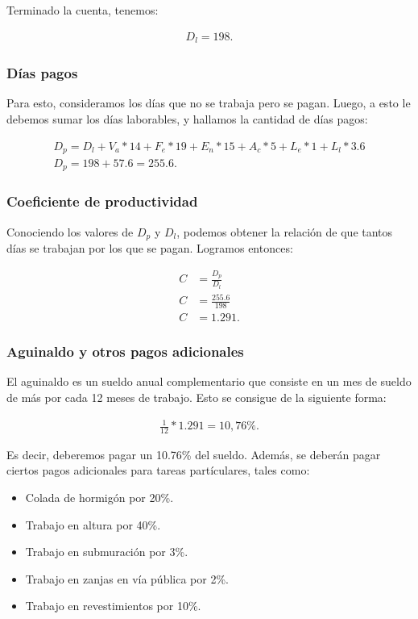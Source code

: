 \documentclass[../main.tex]{subfiles}
\begin{document}
Terminado la cuenta, tenemos:

\begin{align*}
  D_l = 198
.\end{align*}

\subsubsection{Días pagos}

Para esto, consideramos los días que no se trabaja pero se pagan. Luego, a esto
le debemos sumar los días laborables, y hallamos la cantidad de días pagos:

\begin{align*}
D_p = D_l + V_a * 14 + F_e * 19 + E_n * 15 + A_c * 5 + L_e * 1 + L_l * 3.6 \\[5pt]
D_p = 198 + 57.6 = 255.6
.\end{align*}

\subsubsection{Coeficiente de productividad}

Conociendo los valores de $D_p$ y $D_{l}$, podemos obtener la relación de que tantos
días se trabajan por los que se pagan. Logramos entonces:

\begin{align*}
 C &= \frac{D_p}{D_l} \\[5pt]
 C &= \frac{255.6}{198} \\[5pt]
 C &= 1.291
.\end{align*}

\subsubsection{Aguinaldo y otros pagos adicionales}

El aguinaldo es un sueldo anual complementario que consiste en un mes de sueldo 
de más por cada 12 meses de trabajo. Esto se consigue de la siguiente forma:

\begin{align*}
  \frac{1}{12} * 1.291 = 10,76 \%
.\end{align*}

Es decir, deberemos pagar un 10.76\% del sueldo. 
Además, se deberán pagar ciertos pagos adicionales para tareas partículares, tales
como:

\begin{itemize}
  \item Colada de hormigón por 20\%.
  \item Trabajo en altura por 40\%.
  \item Trabajo en submuración por 3\%.
  \item Trabajo en zanjas en vía pública por 2\%.
  \item Trabajo en revestimientos por 10\%.
\end{itemize}
\end{document}
